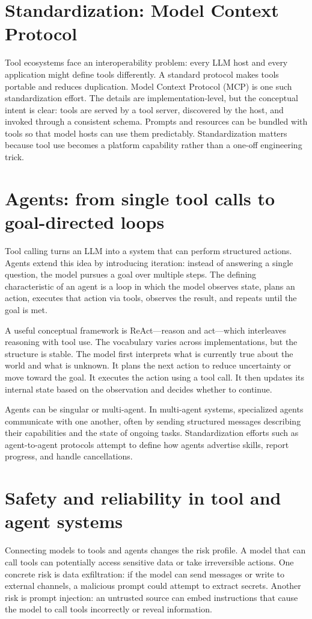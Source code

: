 \section{Standardization: Model Context Protocol}
Tool ecosystems face an interoperability problem: every LLM host and every application might define tools differently. A standard protocol makes tools portable and reduces duplication. Model Context Protocol (MCP) is one such standardization effort. The details are implementation-level, but the conceptual intent is clear: tools are served by a tool server, discovered by the host, and invoked through a consistent schema. Prompts and resources can be bundled with tools so that model hosts can use them predictably. Standardization matters because tool use becomes a platform capability rather than a one-off engineering trick.

\section{Agents: from single tool calls to goal-directed loops}
Tool calling turns an LLM into a system that can perform structured actions. Agents extend this idea by introducing iteration: instead of answering a single question, the model pursues a goal over multiple steps. The defining characteristic of an agent is a loop in which the model observes state, plans an action, executes that action via tools, observes the result, and repeats until the goal is met.

A useful conceptual framework is ReAct—reason and act—which interleaves reasoning with tool use. The vocabulary varies across implementations, but the structure is stable. The model first interprets what is currently true about the world and what is unknown. It plans the next action to reduce uncertainty or move toward the goal. It executes the action using a tool call. It then updates its internal state based on the observation and decides whether to continue.

Agents can be singular or multi-agent. In multi-agent systems, specialized agents communicate with one another, often by sending structured messages describing their capabilities and the state of ongoing tasks. Standardization efforts such as agent-to-agent protocols attempt to define how agents advertise skills, report progress, and handle cancellations.

\section{Safety and reliability in tool and agent systems}
Connecting models to tools and agents changes the risk profile. A model that can call tools can potentially access sensitive data or take irreversible actions. One concrete risk is data exfiltration: if the model can send messages or write to external channels, a malicious prompt could attempt to extract secrets. Another risk is prompt injection: an untrusted source can embed instructions that cause the model to call tools incorrectly or reveal information.

